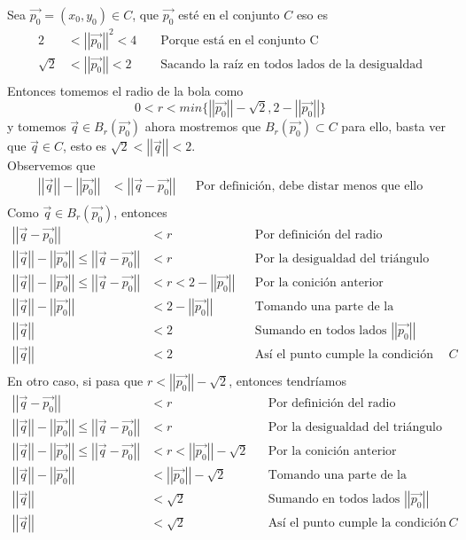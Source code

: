\documentclass[letterpaper]{article}
\providecommand{\norm}[1]{\left|\left|#1\right|\right|}
\renewcommand{\*}{\cdot}
\theoremstyle{definition}
\begin{document}
Sea $ \vec{p_0} = (x_0, y_0) \in C  $, que $ \vec{p_0} $ esté en el conjunto $ C $ eso es 
\begin{align*}
	2 &< \norm{\vec{p_0}}^2 < 4 &&\text{ Porque está en el conjunto C}\\
	\sqrt{2} &< \norm{\vec{p_0}} < 2 &&\text{ Sacando la raíz en todos lados de la desigualdad}\\
\end{align*} 
Entonces tomemos el radio de la bola como 
\[ 0 < r < min \{ \norm{\vec{p_0}} - \sqrt{2}, 2- \norm{\vec{p_0}} \} \]
y tomemos $ \vec{q} \in B_r(\vec{p_0}) $ ahora mostremos que $ B_r(\vec{p_0}) \subset C $ para ello, basta ver que $ \vec{q} \in C $, esto es $ \sqrt{2} < \norm{\vec{q}} < 2 $.\\
Observemos que 
\begin{align*}
	\norm{\vec{q}} - \norm{\vec{p_0}} &< \norm{\vec{q} - \vec{p_0}} &&\text{Por definición, debe distar menos que ello}\\
\end{align*}
Como $ \vec{q}\in B_r(\vec{p_0}) $, entonces
\begin{align*}
	\norm{\vec{q} - \vec{p_0}} &< r && \text{Por definición del radio}\\
	\norm{\vec{q}} - \norm{\vec{p_0}} \leq \norm{\vec{q} - \vec{p_0}} &< r && \text{Por la desigualdad del triángulo}\\
	\norm{\vec{q}} - \norm{\vec{p_0}} \leq \norm{\vec{q} - \vec{p_0}} &< r < 2 - \norm{\vec{p_0}} && \text{Por la conición anterior}\\
	\norm{\vec{q}} - \norm{\vec{p_0}} &<  2 - \norm{\vec{p_0}} && \text{Tomando una parte de la inequidad}\\
	\norm{\vec{q}}  &< 2&& \text{Sumando en todos lados } \norm{\vec{p_0}} \\
	\norm{\vec{q}} &< 2&& \text{Así el punto cumple la condición de estar en } C\\
\end{align*}
En otro caso, si pasa que $ r < \norm{\vec{p_0}} - \sqrt{2} $, entonces tendríamos
\begin{align*}
	\norm{\vec{q} - \vec{p_0}} &< r && \text{Por definición del radio}\\
	\norm{\vec{q}} - \norm{\vec{p_0}} \leq \norm{\vec{q} - \vec{p_0}} &< r && \text{Por la desigualdad del triángulo}\\
	\norm{\vec{q}} - \norm{\vec{p_0}} \leq \norm{\vec{q} - \vec{p_0}} &< r < \norm{\vec{p_0}} - \sqrt{2} && \text{Por la conición anterior}\\
	\norm{\vec{q}} - \norm{\vec{p_0}} &<  \norm{\vec{p_0}} - \sqrt{2} && \text{Tomando una parte de la inequidad}\\
	\norm{\vec{q}}  &< \sqrt{2}&& \text{Sumando en todos lados } 		\norm{\vec{p_0}} \\
	\norm{\vec{q}} &< \sqrt{2}&& \text{Así el punto cumple la condición de estar en } C\\
\end{align*}
\end{document}
